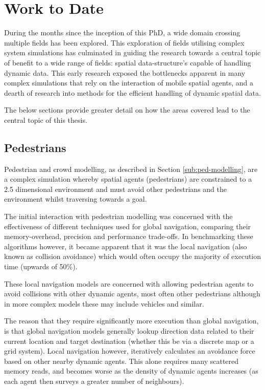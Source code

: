 \chapter{Work to Date\label{chap:work2date}}
  During the months since the inception of this PhD, a wide domain crossing multiple fields has been explored. This exploration of fields utilising complex system simulations has culminated in guiding the research towards a central topic of benefit to a wide range of fields: spatial data-structure's capable of handling dynamic data. This early research exposed the bottlenecks apparent in many complex simulations that rely on the interaction of mobile spatial agents, and a dearth of research into methods for the efficient handling of dynamic spatial data.
  
  The below sections provide greater detail on how the areas covered lead to the central topic of this thesis.
  
 \section{Pedestrians}
    Pedestrian and crowd modelling, as described in Section \ref{sub:ped-modelling}, are a complex simulation whereby spatial agents (pedestrians) are constrained to a 2.5 dimensional environment and must avoid other pedestrians and the environment whilst traversing towards a goal.
    
    The initial interaction with pedestrian modelling was concerned with the effectiveness of different techniques used for global navigation, comparing their memory-overhead, precision and performance trade-offs. In benchmarking these algorithms however, it became apparent that it was the local navigation (also known as collision avoidance) which would often occupy the majority of execution time (upwards of 50\%).
    
    These local navigation models are concerned with allowing pedestrian agents to avoid collisions with other dynamic agents, most often other pedestrians although in more complex models these may include vehicles and similar.
    
    The reason that they require significantly more execution than global navigation, is that global navigation models generally lookup direction data related to their current location and target destination (whether this be via a discrete map or a grid system). Local navigation however, iteratively calculates an avoidance force based on other nearby dynamic agents. This alone requires many scattered memory reads, and becomes worse as the density of dynamic agents increases (as each agent then surveys a greater number of neighbours).
    
